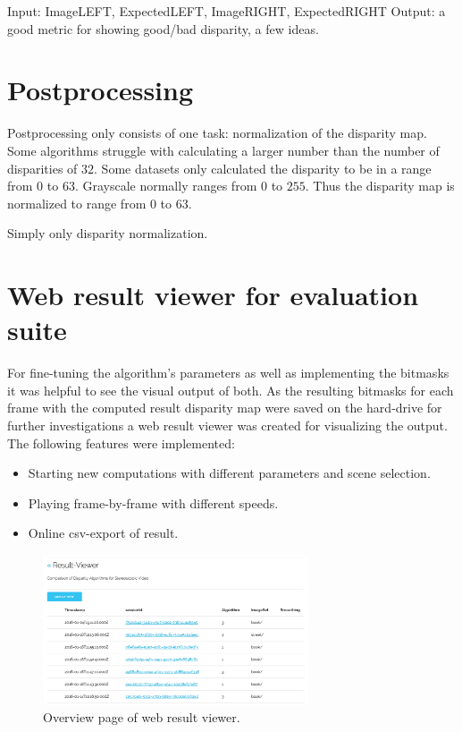 Input: ImageLEFT, ExpectedLEFT, ImageRIGHT, ExpectedRIGHT
Output: a good metric for showing good/bad disparity, a few ideas.

\section{Postprocessing}

Postprocessing only consists of one task: normalization of the disparity map.
Some algorithms struggle with calculating a larger number than the number of disparities of $32$.
Some datasets only calculated the disparity to be in a range from $0$ to $63$.
Grayscale normally ranges from $0$ to $255$.
Thus the disparity map is normalized to range from $0$ to $63$.

Simply only disparity normalization.

\section{Web result viewer for evaluation suite}

For fine-tuning the algorithm's parameters as well as implementing the bitmasks it was helpful to see the visual output of both.
As the resulting bitmasks for each frame with the computed result disparity map were saved on the hard-drive for further investigations a web result viewer was created for visualizing the output.
The following features were implemented:
\begin{itemize}
  \item Starting new computations with different parameters and scene selection.
  \item Playing frame-by-frame with different speeds.
  \item Online csv-export of result.
\end{itemize}

\begin{figure}[p!]
  \centering
  \includegraphics[angle=90,width=0.7\textwidth]{src/images/result-viewer-overview.png}
  \caption{Overview page of web result viewer.}
  \label{fig:web-overview}
\end{figure}

